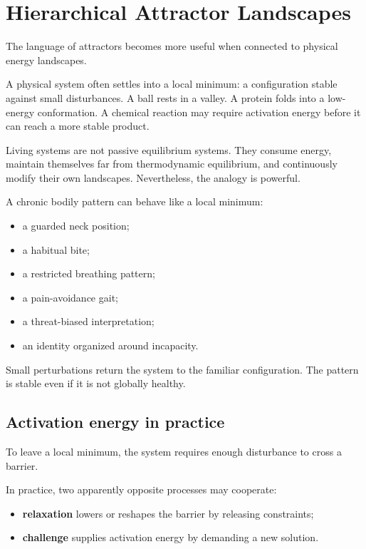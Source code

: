 \chapter{Hierarchical Attractor Landscapes}

The language of attractors becomes more useful when connected to physical energy landscapes.

A physical system often settles into a local minimum: a configuration stable against small disturbances. A ball rests in a valley. A protein folds into a low-energy conformation. A chemical reaction may require activation energy before it can reach a more stable product.

Living systems are not passive equilibrium systems. They consume energy, maintain themselves far from thermodynamic equilibrium, and continuously modify their own landscapes. Nevertheless, the analogy is powerful.

A chronic bodily pattern can behave like a local minimum:

\begin{itemize}
\tightlist
\item
  a guarded neck position;
\item
  a habitual bite;
\item
  a restricted breathing pattern;
\item
  a pain-avoidance gait;
\item
  a threat-biased interpretation;
\item
  an identity organized around incapacity.
\end{itemize}

Small perturbations return the system to the familiar configuration. The pattern is stable even if it is not globally healthy.

\section{Activation energy in practice}

To leave a local minimum, the system requires enough disturbance to cross a barrier.

In practice, two apparently opposite processes may cooperate:

\begin{itemize}
\tightlist
\item
  \textbf{relaxation} lowers or reshapes the barrier by releasing constraints;
\item
  \textbf{challenge} supplies activation energy by demanding a new solution.
\end{itemize}

